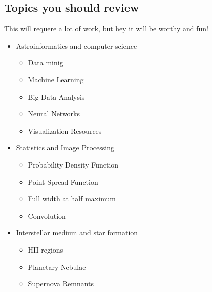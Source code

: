 \documentclass[11pt,fleqn]{book} %
\begin{document}
																									    \subsection{Topics you should review}
																									    This will requere a lot of work, but hey it will be worthy and fun!
																									    \begin{itemize}
																									    	\item Astroinformatics and computer science
																										    	\begin{itemize}
																											        	\item Data minig
																													            \item Machine Learning
																														                \item Big Data Analysis
																																            \item Neural Networks
																																	                \item Visualization Resources
																																			        \end{itemize}
																																				    \item Statistics and Image Processing
																																				        	\begin{itemize}
																																						        	\item Probability Density Function
																																								            \item Point Spread Function
																																									                \item Full width at half maximum
																																											            \item Convolution
																																												            \end{itemize}
																																													        \item Interstellar medium and star formation
																																														    	\begin{itemize}
																																															        	\item HII regions
																																																	            \item Planetary Nebulae
																																																		                \item Supernova Remnants

\end{itemize}
\end{itemize}
\end{document}
